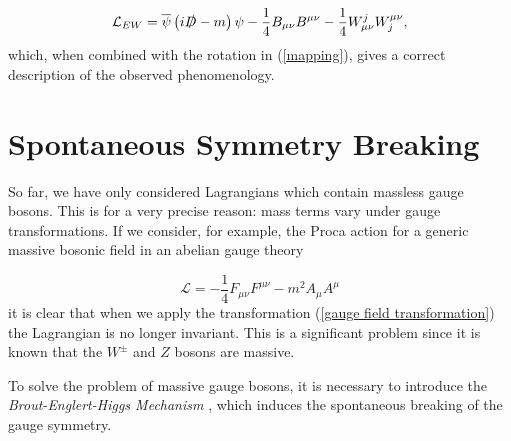 \documentclass[10pt,a4paper]{book}
\begin{document}
\begin{equation}
\label{EW lagrangian}
\mathcal{L}_{EW} = \overline{\psi}\left(i\slashed{D} - m\right)\psi - \frac{1}{4}B_{\mu\nu}B^{\mu\nu} - \frac{1}{4}W^j_{\mu\nu}W_j^{\mu\nu},
\end{equation}
which, when combined with the rotation in (\ref{mapping}), gives a correct description of the observed phenomenology.
\section{Spontaneous Symmetry Breaking}
\label{Higgs section}

So far, we have only considered Lagrangians which contain massless gauge bosons. This is for a very precise reason: mass terms vary under gauge transformations. If we consider, for example, the Proca action for a generic massive bosonic field in an abelian gauge theory

\begin{equation}
\mathcal{L} = -\frac{1}{4}F_{\mu\nu}F^{\mu\nu} - m^2 A_\mu A^\mu
\end{equation}
it is clear that when we apply the transformation (\ref{gauge field transformation}) the Lagrangian is no longer invariant. This is a significant problem since it is known that the $W^\pm$ and $Z$ bosons are massive.

To solve the problem of massive gauge bosons, it is necessary to introduce the \emph{Brout-Englert-Higgs Mechanism} \cite{PhysRevLett.13.508, PhysRevLett.19.1264}, which induces the spontaneous breaking of the gauge symmetry. 
\end{document}
